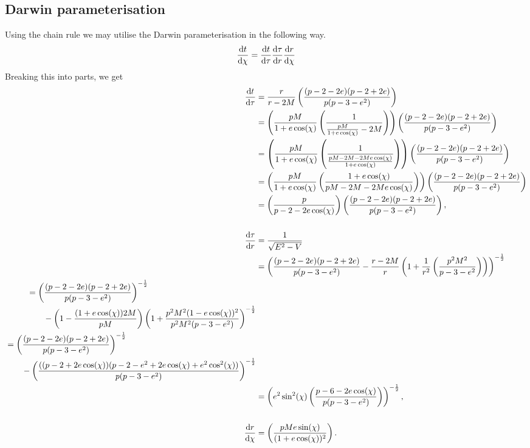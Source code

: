 \subsection{Darwin parameterisation}
\label{apx:darwin}
Using the chain rule we may utilise the Darwin parameterisation in the following way.
\begin{equation}
\dv{t}{\chi}=\dv{t}{\tau}\dv{\tau}{r}\dv{r}{\chi}
\end{equation}
Breaking this into parts, we get
\begin{align}
\dv{t}{\tau}&=\frac{r}{r-2M}\left(\frac{(p-2-2e)(p-2+2e)}{p(p-3-e^2)}\right)\\
&=\left(\frac{pM}{1+e\cos(\chi)}\left(\frac{1}{\frac{pM}{1+e\cos(\chi)}-2M} \right) \right)\left(\frac{(p-2-2e)(p-2+2e)}{p(p-3-e^2)}\right)\\
&=\left(\frac{pM}{1+e\cos(\chi)}\left(\frac{1}{\frac{pM-2M-2Me\cos(\chi)}{1+e\cos(\chi)}} \right) \right)\left(\frac{(p-2-2e)(p-2+2e)}{p(p-3-e^2)}\right)\\
&=\left(\frac{pM}{1+e\cos(\chi)}\left(\frac{1+e\cos(\chi)}{pM-2M-2Me\cos(\chi)} \right) \right)\left(\frac{(p-2-2e)(p-2+2e)}{p(p-3-e^2)}\right)\\
&=\left(\frac{p}{p-2-2e\cos(\chi)} \right)\left(\frac{(p-2-2e)(p-2+2e)}{p(p-3-e^2)}\right),\\
&\\
\dv{\tau}{r}&=\frac{1}{\sqrt{E^2-V}}\\
&=\left(\frac{(p-2-2e)(p-2+2e)}{p(p-3-e^2)}-\frac{r-2M}{r}\left(1+\frac{1}{r^2}\left(\frac{p^2M^2}{p-3-e^2} \right) \right)\right)^{-\frac{1}{2}}\\
\begin{split}
&=\left(\frac{(p-2-2e)(p-2+2e)}{p(p-3-e^2)}\right)^{-\frac{1}{2}}\\
&\qquad-\left(1-\frac{(1+e\cos(\chi))2M}{pM} \right)\left(1+\frac{p^2M^2(1-e\cos(\chi))^2}{p^2M^2(p-3-e^2)}\right)^{-\frac{1}{2}}
\end{split}\\
\begin{split}
&=\left(\frac{(p-2-2e)(p-2+2e)}{p(p-3-e^2)}\right)^{-\frac{1}{2}}\\
&\qquad-\left(\frac{((p-2+2e\cos(\chi))(p-2-e^2+2e\cos(\chi)+e^2\cos^2(\chi))}{p(p-3-e^2)} \right)^{-\frac{1}{2}}
\end{split}\\
&=\left(e^2\sin^2(\chi)\left(\frac{p-6-2e\cos(\chi)}{p(p-3-e^2)} \right)\right)^{-\frac{1}{2}},\\
&\\
\dv{r}{\chi}&=\left(\frac{pMe\sin(\chi)}{(1+e\cos(\chi))^2} \right).
\end{align}
